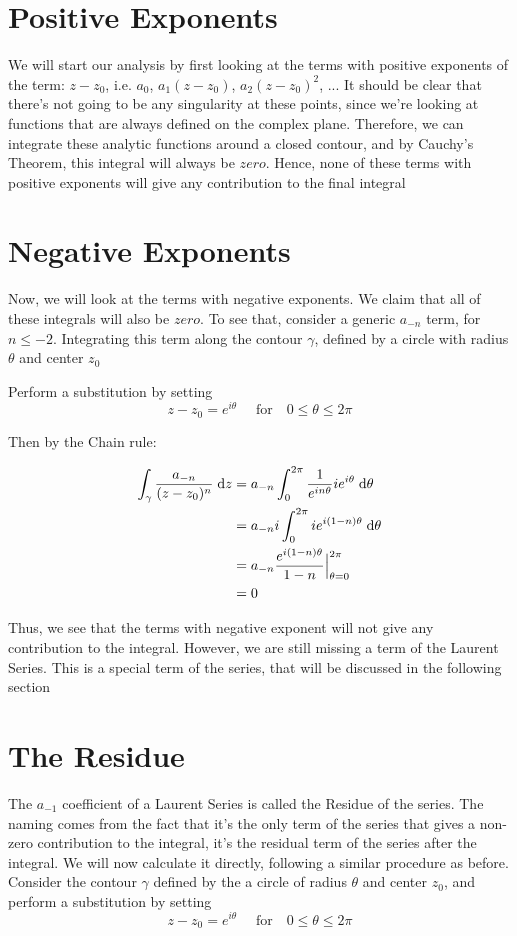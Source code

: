 \documentclass[12pt, letterpaper]{article}
\begin{document}
\section*{Positive Exponents}

We will start our analysis by first looking at the terms with positive exponents of the term: \( z - z_{0}\), i.e. \(a_{0}\), $a_{1}(z - z_{0})$,  $a_{2}(z - z_{0})^2$, ... It should be clear that there’s not going to be any singularity at these points, since we’re looking at functions that are always defined on the complex plane. Therefore, we can integrate these analytic functions around a closed contour, and by Cauchy's Theorem, this integral will always be \(zero\). Hence, none of these terms with positive exponents will give any contribution to the final integral
\bigskip

\section*{Negative Exponents}

Now, we will look at the terms with negative exponents. We claim that all of these integrals will also be \(zero\). To see that, consider a generic \( a_{-n}\) term, for \(n \leq -2\). Integrating this term along the contour \(\gamma\), defined by a circle with radius \(\theta\) and center \( z_{0}\)
\bigskip

\noindent
Perform a substitution by setting 
\[z - z_{0} = e^{i\theta} \quad \text{ for}  \quad 0 \leq \theta \leq 2\pi \]

\noindent
Then by the Chain rule: 

\begin{align*}
\centering 
\int_{\gamma}^{} \frac{a_{-n}}{(z - z_{0})^n} \;\mathrm{d}z &= a_{-n}\int_{0}^{2\pi} \frac{1}{e^{in\theta}} ie^{i\theta} \;\mathrm{d}\theta \\
&= a_{-n}i\int_{0}^{2\pi} ie^{i(1-n)\theta} \;\mathrm{d}\theta \\
&= a_{-n} \frac{e^{i(1-n)\theta}}{1-n} \Big|_{\theta = 0}^{2\pi} \\
&= 0
\end{align*}

\noindent
Thus, we see that the terms with negative exponent will not give any contribution to the integral. However, we are still missing a term of the Laurent Series. This is a special term of the series, that will be discussed in the following section
\bigskip

\section*{The Residue}
The \(a_{-1}\) coefficient of a Laurent Series is called the Residue of the series. The naming comes from the fact that it's the only term of the series that gives a non-zero contribution to the integral, it's the residual term of the series after the integral. We will now calculate it directly, following a similar procedure as before. Consider the contour \(\gamma\) defined by the a circle of radius \(\theta\) and center \(z_{0}\), and perform a substitution by setting 
\[z - z_{0} = e^{i\theta} \quad \text{ for}  \quad 0 \leq \theta \leq 2\pi \]
\end{document}
